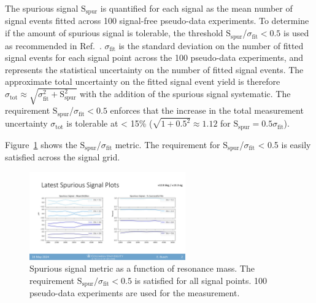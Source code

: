 The spurious signal $\text{S}_{\text{spur}}$ is quantified for each signal as the mean number of signal events fitted across 100 signal-free pseudo-data experiments. 
To determine if the amount of spurious signal is tolerable, the threshold $\text{S}_{\text{spur}}$/$\sigma_{\text{fit}} < 0.5$ is used as recommended in Ref.~\cite{smooth_bkg}.
$\sigma_{\text{fit}}$ is the standard deviation on the number of fitted signal events for each signal point across the 100 pseudo-data experiments, and represents the statistical uncertainty on the number of fitted signal events.
The approximate total uncertainty on the fitted signal event yield is therefore $\sigma_\text{tot} \approx \sqrt{\sigma_\text{fit}^2 + \text{S}_\text{spur}^2}$ with the addition of the spurious signal systematic.
The requirement $\text{S}_{\text{spur}}$/$\sigma_{\text{fit}} < 0.5$ enforces that the increase in the total measurement uncertainty $\sigma_\text{tot}$ is tolerable at < 15\% ($\sqrt{1+0.5^2} \approx 1.12$ for $\text{S}_{\text{spur}} = 0.5\sigma_\text{fit}$).

Figure~\ref{fig:spursig} shows the $\text{S}_{\text{spur}}$/$\sigma_{\text{fit}}$ metric.
The requirement for $\text{S}_{\text{spur}}$/$\sigma_{\text{fit}}$ < 0.5 is easily satisfied across the signal grid.
\begin{figure}[!htbp]
\centering
   \includegraphics[width=0.6\textwidth]{figures/systs/spursig}
    \caption{Spurious signal metric as a function of resonance mass. The requirement $\text{S}_\text{spur}/\sigma_\text{fit} <0.5$ is satisfied for all signal points. 100 pseudo-data experiments are used for the measurement.
    \label{fig:spursig}}
\end{figure}


